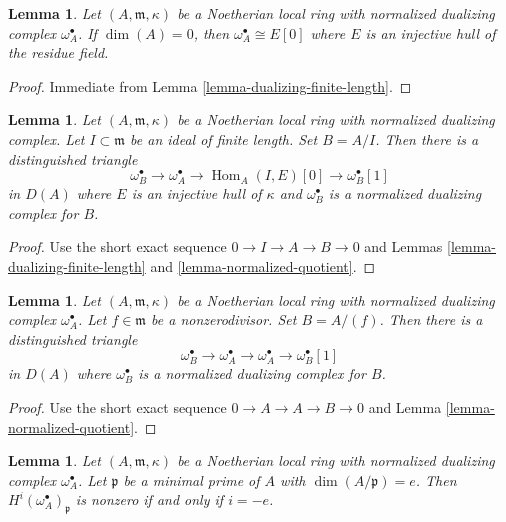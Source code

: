 \documentclass{stacks-project}
\theoremstyle{plain}
\newtheorem{lemma}[subsection]{Lemma}
\theoremstyle{definition}
\theoremstyle{remark}
\numberwithin{equation}{subsection}
\def\Hom{\mathop{\mathrm{Hom}}\nolimits}
\begin{document}
\begin{lemma}
\label{lemma-dualizing-artinian}
Let $(A, \mathfrak m, \kappa)$ be a Noetherian local
ring with normalized dualizing complex $\omega_A^\bullet$.
If $\dim(A) = 0$, then $\omega_A^\bullet \cong E[0]$
where $E$ is an injective hull of the residue field.
\end{lemma}

\begin{proof}
Immediate from Lemma \ref{lemma-dualizing-finite-length}.
\end{proof}

\begin{lemma}
\label{lemma-divide-by-finite-length-ideal}
Let $(A, \mathfrak m, \kappa)$ be a Noetherian local
ring with normalized dualizing complex. Let $I \subset \mathfrak m$ be an
ideal of finite length. Set $B = A/I$. Then there is a distinguished
triangle
$$
\omega_B^\bullet \to \omega_A^\bullet \to \Hom_A(I, E)[0] \to
\omega_B^\bullet[1]
$$
in $D(A)$ where $E$ is an injective hull of $\kappa$ and
$\omega_B^\bullet$ is a normalized dualizing complex for $B$.
\end{lemma}

\begin{proof}
Use the short exact sequence $0 \to I \to A \to B \to 0$
and Lemmas \ref{lemma-dualizing-finite-length} and
\ref{lemma-normalized-quotient}.
\end{proof}

\begin{lemma}
\label{lemma-divide-by-nonzerodivisor}
Let $(A, \mathfrak m, \kappa)$ be a Noetherian local
ring with normalized dualizing complex $\omega_A^\bullet$.
Let $f \in \mathfrak m$ be a
nonzerodivisor. Set $B = A/(f)$. Then there is a distinguished
triangle
$$
\omega_B^\bullet \to \omega_A^\bullet \to \omega_A^\bullet \to
\omega_B^\bullet[1]
$$
in $D(A)$ where $\omega_B^\bullet$ is a normalized dualizing complex
for $B$.
\end{lemma}

\begin{proof}
Use the short exact sequence $0 \to A \to A \to B \to 0$
and Lemma \ref{lemma-normalized-quotient}.
\end{proof}

\begin{lemma}
\label{lemma-nonvanishing-generically-local}
Let $(A, \mathfrak m, \kappa)$ be a Noetherian local ring with
normalized dualizing complex $\omega_A^\bullet$.
Let $\mathfrak p$ be a minimal prime of $A$ with
$\dim(A/\mathfrak p) = e$. Then
$H^i(\omega_A^\bullet)_\mathfrak p$ is nonzero
if and only if $i = -e$.
\end{lemma}
\end{document}
